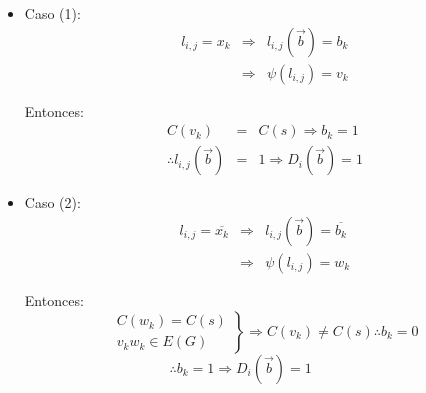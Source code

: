 \documentclass[12pt,a4paper]{report}
\newcounter{neq}
\begin{document}
				\begin{itemize}
					\item Caso (1):
						\begin{eqnarray}
							\nonumber l_{i, j} = x_{k} &\Rightarrow & l_{i, j}(\overrightarrow{b}) = b_{k} \\
							\nonumber &\Rightarrow& \psi(l_{i, j}) = v_{k}
						\end{eqnarray}
						\par Entonces:
						\begin{eqnarray}
							\nonumber C(v_{k}) &=& C(s) \Rightarrow b_{k} = 1 \\
							\nonumber \therefore l_{i, j}(\overrightarrow{b}) &=& 1 \Rightarrow D_{i}(\overrightarrow{b}) = 1
						\end{eqnarray}
					\item Caso (2):
						\begin{eqnarray}
							\nonumber l_{i, j} = \overline{x_{k}} &\Rightarrow & l_{i, j}(\overrightarrow{b}) = 	\overline{b_{k}} \\
							\nonumber &\Rightarrow& \psi(l_{i, j}) = w_{k}
						\end{eqnarray}
						\par Entonces:
						\begin{equation*}
		  				\left.
		  				\begin{array}{l}
		    		 		C(w_{k}) = C(s) \\
		    		 		v_{k} w_{k} \in E(G)
		  				\end{array}
		 			 		\right\rbrace
		 			 		\Rightarrow C(v_{k}) \neq C(s) \therefore b_{k} = 0
						\end{equation*}
						$\qquad\qquad\qquad\qquad\qquad$
						$\therefore b_{k} = 1 \Rightarrow D_{i}(\overrightarrow{b}) = 1$
				\end{itemize}
\end{document}
